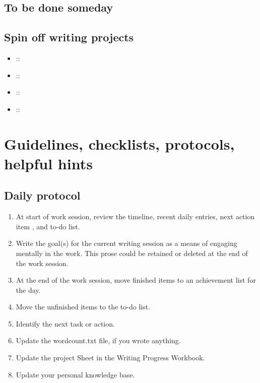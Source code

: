 \documentclass[11pt,letterpaper]{article}
\begin{document}
\subsection{To be done someday}
\label{sec:orgbde3dff}

\subsection{Spin off writing projects}
\label{sec:org54f9f71}


\begin{itemize}
\item ::
\item ::
\item ::
\item ::
\end{itemize}


\section{Guidelines, checklists, protocols, helpful hints}
\label{sec:org99565c2}


\subsection{Daily protocol}
\label{sec:orgf8f4f32}


\begin{enumerate}
\item At start of work session, review the timeline, recent daily entries, next action item , and
to-do list.
\item Write the goal(s) for the current writing session as a means of
engaging mentally in the work. This prose could be retained or
deleted at the end of the work session.
\item At the end of the work session, move finished items to an achievement
list for the day.
\item Move the unfinished items to the to-do list.
\item Identify the next task or action.
\item Update the wordcount.txt file, if you wrote anything.
\item Update the project Sheet in the Writing Progress Workbook.
\item Update your personal knowledge base.
\end{enumerate}
\end{document}
